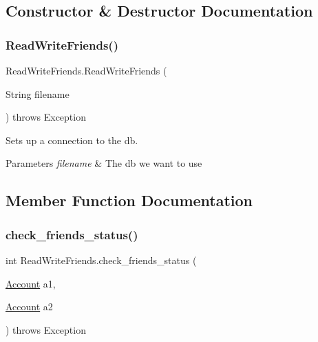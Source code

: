 \subsection{Constructor \& Destructor Documentation}
\mbox{\label{class_read_write_friends_afccd5d07c3f694a74617a749ee4d5d09}} 
\subsubsection{\texorpdfstring{Read\+Write\+Friends()}{ReadWriteFriends()}}
{\footnotesize\ttfamily Read\+Write\+Friends.\+Read\+Write\+Friends (\begin{DoxyParamCaption}\item[{String}]{filename }\end{DoxyParamCaption}) throws Exception}



Sets up a connection to the db. 


\begin{DoxyParams}{Parameters}
{\em filename} & The db we want to use \\
\hline
\end{DoxyParams}


\subsection{Member Function Documentation}
\mbox{\label{class_read_write_friends_abbe5f06f2119c20d3015b91b4b1c728f}} 
\subsubsection{\texorpdfstring{check\+\_\+friends\+\_\+status()}{check\_friends\_status()}}
{\footnotesize\ttfamily int Read\+Write\+Friends.\+check\+\_\+friends\+\_\+status (\begin{DoxyParamCaption}\item[{\hyperlink{class_account}{Account}}]{a1,  }\item[{\hyperlink{class_account}{Account}}]{a2 }\end{DoxyParamCaption}) throws Exception}



